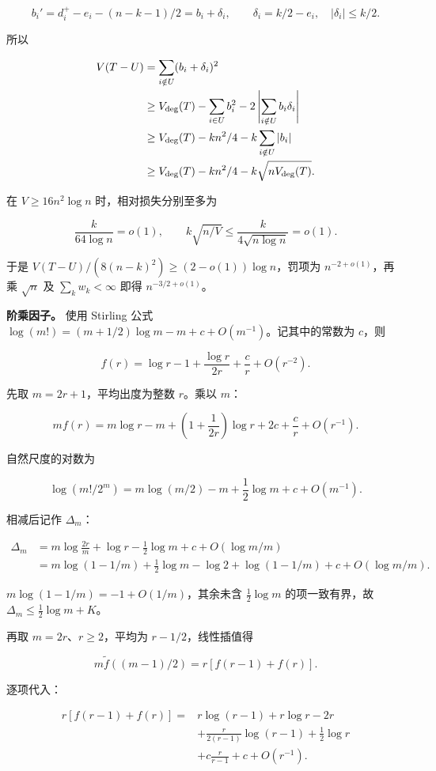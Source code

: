 \documentclass[11pt,a4paper]{article}
\begin{document}
\[
b_i'=d_i^+-e_i-(n-k-1)/2=b_i+\delta_i,
\qquad\delta_i=k/2-e_i,\quad |\delta_i|\le k/2.
\]

所以

\[
\begin{aligned}
V(T-U)&=\sum_{i\notin U}(b_i+\delta_i)^2\\
&\ge V_{\rm deg}(T)-\sum_{i\in U}b_i^2-2\left|\sum_{i\notin U}b_i\delta_i\right|\\
&\ge V_{\rm deg}(T)-kn^2/4-k\sum_{i\notin U}|b_i|\\
&\ge V_{\rm deg}(T)-kn^2/4-k\sqrt{nV_{\rm deg}(T)}.
\end{aligned}
\]

在 \(V\ge16n^2\log n\) 时，相对损失分别至多为

\[
\frac{k}{64\log n}=o(1),\qquad
k\sqrt{n/V}\le\frac{k}{4\sqrt{n\log n}}=o(1).
\]

于是 \(V(T-U)/(8(n-k)^2)\ge(2-o(1))\log n\)，罚项为 \(n^{-2+o(1)}\)，再乘 \(\sqrt n\) 及 \(\sum_kw_k<\infty\) 即得 \(n^{-3/2+o(1)}\)。

\textbf{阶乘因子。} 使用 Stirling 公式 \(\log(m!)=(m+1/2)\log m-m+c+O(m^{-1})\)。记其中的常数为 \(c\)，则

\[
f(r)=\log r-1+\frac{\log r}{2r}+\frac cr+O(r^{-2}).
\]

先取 \(m=2r+1\)，平均出度为整数 \(r\)。乘以 \(m\)：

\[
mf(r)=m\log r-m+\left(1+\frac1{2r}\right)\log r
+2c+\frac cr+O(r^{-1}).
\]

自然尺度的对数为

\[
\log(m!/2^m)=m\log(m/2)-m+\frac12\log m+c+O(m^{-1}).
\]

相减后记作 \(\Delta_m\)：

\[
\begin{aligned}
\Delta_m
&=m\log\frac{2r}{m}+\log r-\frac12\log m
+c+O(\log m/m)\\
&=m\log(1-1/m)+\frac12\log m-\log2
+\log(1-1/m)+c+O(\log m/m).
\end{aligned}
\]

\(m\log(1-1/m)=-1+O(1/m)\)，其余未含 \(\frac12\log m\) 的项一致有界，故 \(\Delta_m\le\frac12\log m+K\)。

再取 \(m=2r\)、\(r\ge2\)，平均为 \(r-1/2\)，线性插值得

\[
m\widetilde f((m-1)/2)=r[f(r-1)+f(r)].
\]

逐项代入：

\[
\begin{aligned}
r[f(r-1)+f(r)]
={}&r\log(r-1)+r\log r-2r\\
&+\frac r{2(r-1)}\log(r-1)+\frac12\log r\\
&+c\frac r{r-1}+c+O(r^{-1}).
\end{aligned}
\]
\end{document}
